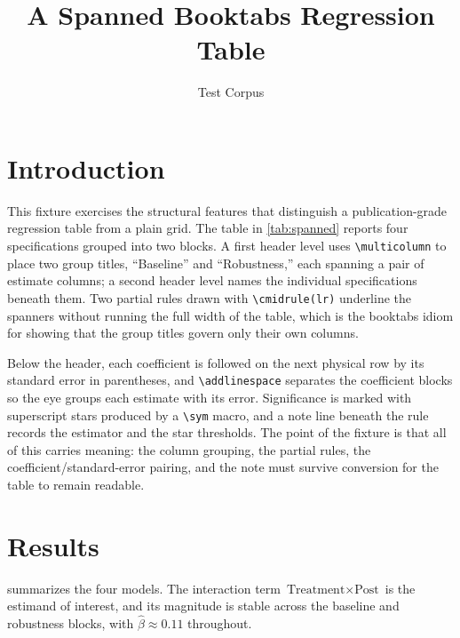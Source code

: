 \documentclass[11pt]{article}
\title{A Spanned Booktabs Regression Table}
\author{Test Corpus}
\date{}
\newcommand{\sym}[1]{\textsuperscript{#1}}
\begin{document}
\maketitle

\section{Introduction}

This fixture exercises the structural features that distinguish a
publication-grade regression table from a plain grid. The table in
\cref{tab:spanned} reports four specifications grouped into two blocks. A first
header level uses \verb|\multicolumn| to place two group titles, ``Baseline''
and ``Robustness,'' each spanning a pair of estimate columns; a second header
level names the individual specifications beneath them. Two partial rules drawn
with \verb|\cmidrule(lr)| underline the spanners without running the full width
of the table, which is the booktabs idiom for showing that the group titles
govern only their own columns.

Below the header, each coefficient is followed on the next physical row by its
standard error in parentheses, and \verb|\addlinespace| separates the
coefficient blocks so the eye groups each estimate with its error. Significance
is marked with superscript stars produced by a \verb|\sym| macro, and a note
line beneath the rule records the estimator and the star thresholds. The point
of the fixture is that all of this carries meaning: the column grouping, the
partial rules, the coefficient/standard-error pairing, and the note must survive
conversion for the table to remain readable.

\section{Results}

 summarizes the four models. The interaction term
$\text{Treatment}\times\text{Post}$ is the estimand of interest, and its
magnitude is stable across the baseline and robustness blocks, with
$\widehat{\beta}\approx 0.11$ throughout.
\end{document}
